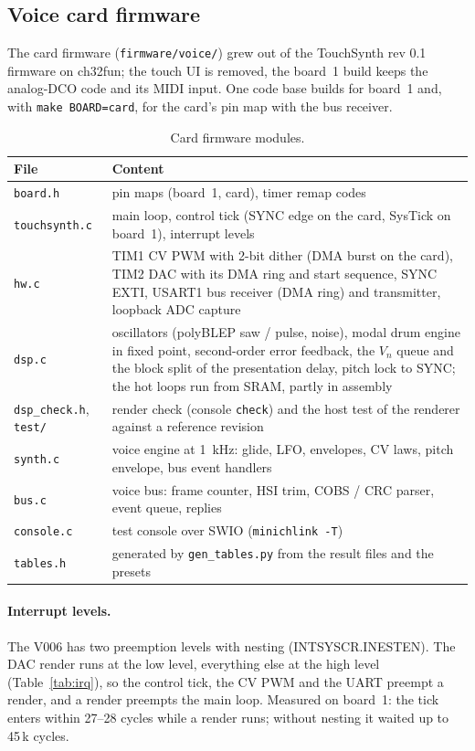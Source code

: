 \documentclass[11pt,a4paper]{article}
\newcommand{\file}[1]{\texttt{#1}}
\begin{document}
\subsection{Voice card firmware}
The card firmware (\file{firmware/voice/}) grew out of the TouchSynth rev 0.1 firmware on ch32fun; the touch UI is removed, the board~1 build keeps the analog-DCO
code and its MIDI input. One code base builds for board~1 and, with \texttt{make BOARD=card}, for the card's pin map
with the bus receiver.
\begin{table}[htbp]
\centering\small
\caption{Card firmware modules.}\label{tab:fwmod}
\begin{tabularx}{\textwidth}{@{}l X@{}}
\toprule
File & Content \\
\midrule
\file{board.h} & pin maps (board~1, card), timer remap codes \\
\file{touchsynth.c} & main loop, control tick (SYNC edge on the card, SysTick on board~1), interrupt levels \\
\file{hw.c} & TIM1 CV PWM with 2-bit dither (DMA burst on the card), TIM2 DAC with its DMA ring and start sequence, SYNC EXTI, USART1 bus
  receiver (DMA ring) and transmitter, loopback ADC capture \\
\file{dsp.c} & oscillators (polyBLEP saw / pulse, noise), modal drum engine in fixed point, second-order error feedback,
  the $V_n$ queue and the block split of the presentation delay, pitch lock to SYNC; the hot loops run from SRAM,
  partly in assembly \\
\file{dsp\_check.h}, \file{test/} & render check (console \texttt{check}) and the host test of the renderer against a
  reference revision \\
\file{synth.c} & voice engine at \SI{1}{kHz}: glide, LFO, envelopes, CV laws, pitch envelope, bus event handlers \\
\file{bus.c} & voice bus: frame counter, HSI trim, COBS / CRC parser, event queue, replies \\
\file{console.c} & test console over SWIO (\texttt{minichlink -T}) \\
\file{tables.h} & generated by \file{gen\_tables.py} from the result files and the presets \\
\bottomrule
\end{tabularx}
\end{table}

\paragraph{Interrupt levels.} The V006 has two preemption levels with nesting (INTSYSCR.INESTEN). The DAC render runs
at the low level, everything else at the high level (Table~\ref{tab:irq}), so the control tick, the CV PWM and the
UART preempt a render, and a render preempts the main loop. Measured on board~1: the tick enters within 27--28
cycles while a render runs; without nesting it waited up to 45\,k cycles.
\end{document}
